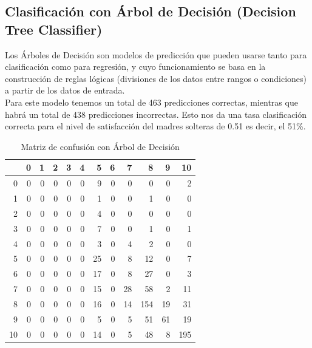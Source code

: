 \documentclass[11pt,twoside]{article}
\begin{document}
\subsection*{Clasificación con Árbol de Decisión (Decision Tree Classifier)}
\noindent
Los Árboles de Decisión son modelos de predicción que pueden usarse tanto para clasificación como para regresión, y cuyo funcionamiento se basa en la construcción de reglas lógicas (divisiones de los datos entre rangos o condiciones) a partir de los datos de entrada.
\\
Para este modelo tenemos un total de 463 predicciones correctas, mientras que habrá un total de 438 predicciones incorrectas. Esto nos da una tasa clasificación correcta para el nivel de satisfacción del madres solteras de 0.51 es decir,  el 51\%.
\begin{table}[H]
	\caption{\small{Matriz de confusión con Árbol de Decisión}}
	\centering
	\begin{tabular}{r|rrrrrrrrrrr}
		\hline
		& 0 & 1 & 2 & 3 & 4 & 5 & 6 & 7 & 8 & 9 & 10 \\ 
		\hline
		0 &   0 &   0 &   0 &   0 &   0 &   9 &   0 &   0 &   0 &   0 &   2 \\ 
		1 &   0 &   0 &   0 &   0 &   0 &   1 &   0 &   0 &   1 &   0 &   0 \\ 
		2 &   0 &   0 &   0 &   0 &   0 &   4 &   0 &   0 &   0 &   0 &   0 \\ 
		3 &   0 &   0 &   0 &   0 &   0 &   7 &   0 &   0 &   1 &   0 &   1 \\ 
		4 &   0 &   0 &   0 &   0 &   0 &   3 &   0 &   4 &   2 &   0 &   0 \\ 
		5 &   0 &   0 &   0 &   0 &   0 &  25 &   0 &   8 &  12 &   0 &   7 \\ 
		6 &   0 &   0 &   0 &   0 &   0 &  17 &   0 &   8 &  27 &   0 &   3 \\ 
		7 &   0 &   0 &   0 &   0 &   0 &  15 &   0 &  28 &  58 &   2 &  11 \\ 
		8 &   0 &   0 &   0 &   0 &   0 &  16 &   0 &  14 & 154 &  19 &  31 \\ 
		9 &   0 &   0 &   0 &   0 &   0 &   5 &   0 &   5 &  51 &  61 &  19 \\ 
		10 &   0 &   0 &   0 &   0 &   0 &  14 &   0 &   5 &  48 &   8 & 195 \\ 
		\hline
	\end{tabular}
\end{table}
\end{document}
